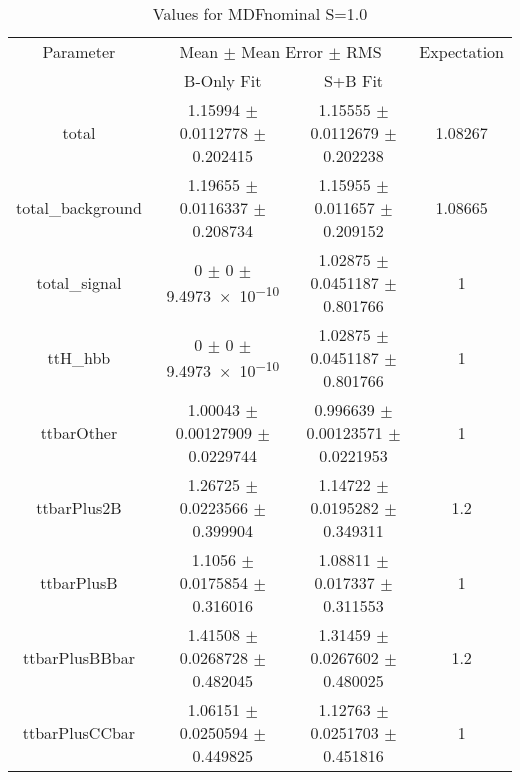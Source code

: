 \begin{table}
\centering
\caption{Values for MDFnominal S=1.0}
\begin{tabular}{cccc}
\toprule
Parameter & \multicolumn{2}{c}{Mean $\pm$ Mean Error $\pm$ RMS} & Expectation\\
 & B-Only Fit & S+B Fit & \\
\midrule
total & \num{1.15994} $\pm$ \num{0.0112778} $\pm$ \num{0.202415} & \num{1.15555} $\pm$ \num{0.0112679} $\pm$ \num{0.202238} & \num{1.08267}\\
total\_background & \num{1.19655} $\pm$ \num{0.0116337} $\pm$ \num{0.208734} & \num{1.15955} $\pm$ \num{0.011657} $\pm$ \num{0.209152} & \num{1.08665}\\
total\_signal & \num{0} $\pm$ \num{0} $\pm$ \num{9.4973e-10} & \num{1.02875} $\pm$ \num{0.0451187} $\pm$ \num{0.801766} & \num{1}\\
ttH\_hbb & \num{0} $\pm$ \num{0} $\pm$ \num{9.4973e-10} & \num{1.02875} $\pm$ \num{0.0451187} $\pm$ \num{0.801766} & \num{1}\\
ttbarOther & \num{1.00043} $\pm$ \num{0.00127909} $\pm$ \num{0.0229744} & \num{0.996639} $\pm$ \num{0.00123571} $\pm$ \num{0.0221953} & \num{1}\\
ttbarPlus2B & \num{1.26725} $\pm$ \num{0.0223566} $\pm$ \num{0.399904} & \num{1.14722} $\pm$ \num{0.0195282} $\pm$ \num{0.349311} & \num{1.2}\\
ttbarPlusB & \num{1.1056} $\pm$ \num{0.0175854} $\pm$ \num{0.316016} & \num{1.08811} $\pm$ \num{0.017337} $\pm$ \num{0.311553} & \num{1}\\
ttbarPlusBBbar & \num{1.41508} $\pm$ \num{0.0268728} $\pm$ \num{0.482045} & \num{1.31459} $\pm$ \num{0.0267602} $\pm$ \num{0.480025} & \num{1.2}\\
ttbarPlusCCbar & \num{1.06151} $\pm$ \num{0.0250594} $\pm$ \num{0.449825} & \num{1.12763} $\pm$ \num{0.0251703} $\pm$ \num{0.451816} & \num{1}\\
\bottomrule
\end{tabular}
\end{table}